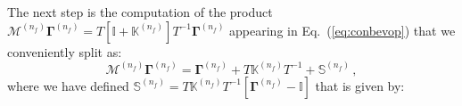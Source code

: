 \documentclass[10pt,a4paper]{article}
\begin{document}
The next step is the computation of the product
$\mathcal{M}^{(n_f)}{\bm\Gamma}^{(n_f)}=T\left[\mathbb{I}+\mathbb{K}^{(n_f)}\right]T^{-1}{\bm\Gamma}^{(n_f)}$
appearing in Eq.~(\ref{eq:conbevop}) that we conveniently split as:
\begin{equation}
\mathcal{M}^{(n_f)}{\bm\Gamma}^{(n_f)}={\bm \Gamma}^{(n_f)}+
T\mathbb{K}^{(n_f)}T^{-1}+\mathbb{S}^{(n_f)}\,,
\label{eq:nthfactor}
\end{equation}
where we have defined
$\mathbb{S}^{(n_f)}=T\mathbb{K}^{(n_f)}
T^{-1}\left[{\bm\Gamma}^{(n_f)}-\mathbb{I}\right]$ that is given by:
\end{document}
